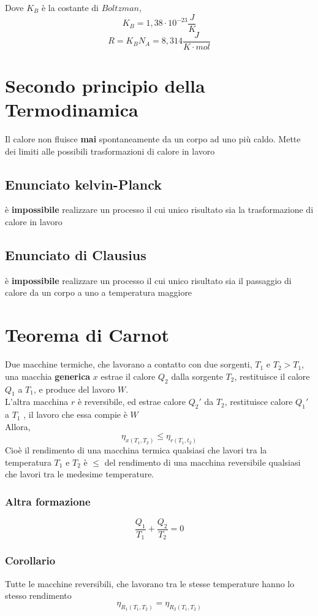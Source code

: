 \documentclass[a4paper]{report}
\begin{document}
  Dove $K_B$ è la costante di $Boltzman$,
  \[ K_B = 1,38 \cdot 10^{-23} \frac{J}{K}\]
  \[ R = K_B N_A = 8,314 \frac{J}{K \cdot mol} \]


  \section{Secondo principio della Termodinamica}
  Il calore non fluisce \textbf{mai} spontaneamente da un corpo ad uno più caldo.
  Mette dei limiti alle possibili trasformazioni di calore in lavoro\\
  \subsection{Enunciato kelvin-Planck}
  è \textbf{impossibile} realizzare un processo il cui unico risultato sia la trasformazione di calore in lavoro
  \subsection{Enunciato di Clausius}
  è \textbf{impossibile} realizzare un processo il cui unico risultato sia il passaggio di calore da un corpo a uno a temperatura maggiore

  \section{Teorema di Carnot}
  Due macchine termiche, che lavorano a contatto con due sorgenti, $T_1$ e $T_2 > T_1$, una macchia \textbf{generica} $x$ estrae il calore $Q_2$ dalla sorgente $T_2$, restituisce il calore $Q_1$ a $T_1$, e produce del lavoro $W$. \\
  L'altra macchina $r$ è reversibile, ed estrae calore $Q_2'$ da $T_2$, restituisce calore $Q_1'$ a $T_1$ , il lavoro che essa compie è $W$\\
  Allora,
  \[ \eta_{x(T_1, T_2)}  \leq \eta_{r(T_1, t_2)} \]
  Cioè il rendimento di una macchina termica qualsiasi che lavori tra la temperatura $T_1$ e $T_2$ è $\leq$ del rendimento di una macchina reversibile qualsiasi che lavori tra le medesime temperature.
  \subsubsection{Altra formazione}
  \[ \frac{Q_1}{T_1} + \frac{Q_2}{T_2} = 0 \]

  \subsubsection{Corollario}
  Tutte le macchine reversibili, che lavorano tra le stesse temperature hanno lo stesso rendimento
  \[ \eta_{R_1(T_1, T_2)} = \eta_{R_2(T_1, T_2)} \]
\end{document}
